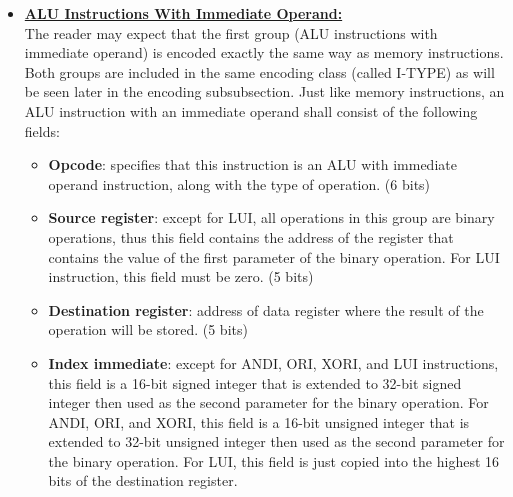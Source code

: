 \documentclass[]{scrartcl}
\begin{document}
\begin{itemize}
\item 

\textbf{\underline{ALU Instructions With Immediate Operand:}} \\

The reader may expect that the first group (ALU instructions
with immediate operand) is encoded exactly the same way as
memory instructions. Both groups are included in the same
encoding class (called I-TYPE) as will be seen later in
the encoding subsubsection. Just like memory instructions,
an ALU instruction with an immediate operand shall consist
of the following fields:

\begin{itemize}

\item \textbf{Opcode}: specifies that this instruction is an ALU
                       with immediate operand instruction, along
                       with the type of operation. (6 bits)

\item \textbf{Source register}: except for LUI, all operations in
                                this group are binary operations, thus
                                this field contains the address of the
                                register that contains the value of
                                the first parameter of the binary
                                operation. For LUI instruction, this
                                field must be zero. (5 bits)

\item \textbf{Destination register}: address of data register where
                                     the result of the operation will
                                     be stored. (5 bits)

\item \textbf{Index immediate}: except for ANDI, ORI, XORI, and LUI
                                instructions, this field is a 16-bit signed
                                integer that is extended to 32-bit signed
                                integer then used as the second parameter
                                for the binary operation. For ANDI, ORI,
                                and XORI, this field is a 16-bit unsigned
                                integer that is extended to 32-bit unsigned
                                integer then used as the second parameter
                                for the binary operation. For LUI, this
                                field is just copied into the highest 16 bits
                                of the destination register.


\end{itemize}
\end{itemize}
\end{document}
